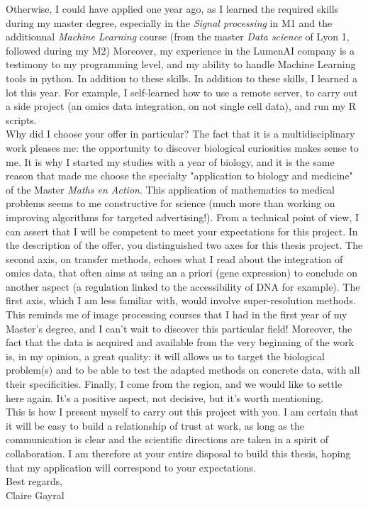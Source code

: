 \documentclass[a4paper,12pt, english]{article}
\begin{document}
Otherwise, I could have applied one year ago, as I learned the required skills during my master degree, especially in the \textit{Signal processing} in M1 and the additionnal \textit{Machine Learning} course (from the master \textit{Data science} of Lyon 1, followed during my M2)
Moreover, my experience in the LumenAI company is a testimony to my programming level, and my ability to handle Machine Learning tools in python. In addition to these skills. %
In addition to these skills, I learned a lot this year. For example, I self-learned how to use a remote server, to carry out a side project (an omics data integration, on not single cell data), and run my R scripts. \\
%

Why did I choose your offer in particular? The fact that it is a multidisciplinary work pleases me: the opportunity to discover biological curiosities makes sense to me. It is why I started my studies with a year of biology, and it is the same reason that made me choose the specialty "application to biology and medicine" of the Master \textit{Maths en Action}. This application of mathematics to medical problems seems to me constructive for science (much more than working on improving algorithms for targeted advertising!). 
From a technical point of view, I can assert that I will be competent to meet your expectations for this project. In the description of the offer, you distinguished two axes for this thesis project. The second axis, on transfer methods, echoes what I read about the integration of omics data, that often aims at using an a priori (gene expression) to conclude on another aspect (a regulation linked to the accessibility of DNA for example). The first axis, which I am less familiar with, would involve super-resolution methods. This reminds me of image processing courses that I had in the first year of my Master's degree, and I can't wait to discover this particular field! %
%
Moreover, the fact that the data is acquired and available from the very beginning of the work is, in my opinion, a great quality: it will allows us to target the biological problem(s) and to be able to test the adapted methods on concrete data, with all their specificities. Finally, I come from the region, and we would like to settle here again. It's a positive aspect, not decisive, but it's worth mentioning. 
\\
%

This is how I present myself to carry out this project with you. I am certain that it will be easy to build a relationship of trust at work, as long as the communication is clear and the scientific directions are taken in a spirit of collaboration. I am therefore at your entire disposal to build this thesis, hoping that my application will correspond to your expectations. \\
%

Best regards, \\

Claire Gayral
\end{document}
